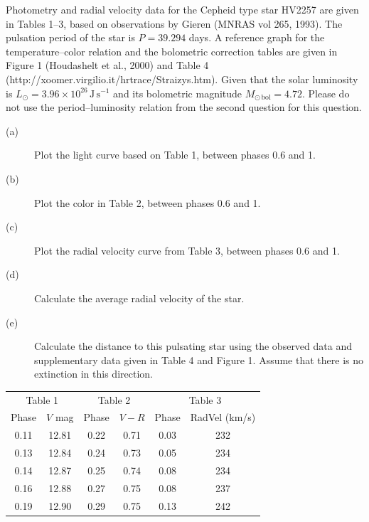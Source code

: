 Photometry and radial velocity data for the Cepheid type star HV2257 are
given in Tables 1--3, based on observations by Gieren (MNRAS vol 265, 1993).
The pulsation period of the star is $P = 39.294$ days. A reference graph for
the temperature--color relation and the bolometric correction tables are
given in Figure 1 (Houdashelt et al., 2000) and Table 4
(http://xoomer.virgilio.it/hrtrace/Straizys.htm). Given that the solar
luminosity is $L_\odot = 3.96 \times 10^{26}\,\mathrm{J\,s^{-1}}$ and its
bolometric magnitude $M_{\odot\,\mathrm{bol}} = 4.72$. Please do not use the
period--luminosity relation from the second question for this question.

\begin{description}
\item[(a)] Plot the light curve based on Table 1, between phases 0.6 and 1.
\item[(b)] Plot the color in Table 2, between phases 0.6 and 1.
\item[(c)] Plot the radial velocity curve from Table 3, between phases 0.6
  and 1.
\item[(d)] Calculate the average radial velocity of the star.
\item[(e)] Calculate the distance to this pulsating star using the observed
  data and supplementary data given in Table 4 and Figure 1. Assume that
  there is no extinction in this direction.
\end{description}

\begin{center}
\begin{tabular}{cc@{\qquad}cc@{\qquad}cc}
\multicolumn{2}{c}{Table 1} & \multicolumn{2}{c}{Table 2}
  & \multicolumn{2}{c}{Table 3} \\
Phase & $V$ mag & Phase & $V-R$ & Phase & RadVel (km/s) \\
0.11 & 12.81 & 0.22 & 0.71 & 0.03 & 232 \\
0.13 & 12.84 & 0.24 & 0.73 & 0.05 & 234 \\
0.14 & 12.87 & 0.25 & 0.74 & 0.08 & 234 \\
0.16 & 12.88 & 0.27 & 0.75 & 0.08 & 237 \\
0.19 & 12.90 & 0.29 & 0.75 & 0.13 & 242 \\
\end{tabular}
\end{center}

